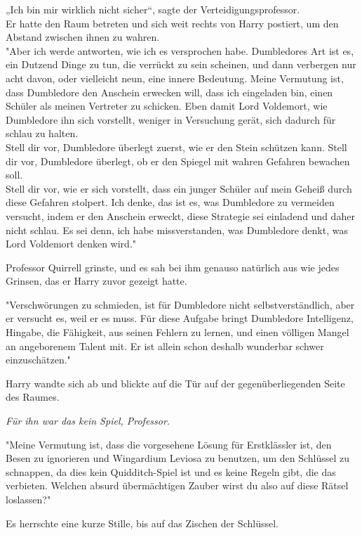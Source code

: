{„Ich bin mir wirklich nicht sicher“, sagte der Verteidigungsprofessor.\\ Er hatte den Raum betreten und sich weit rechts von Harry postiert, um den Abstand zwischen ihnen zu wahren.\\ "Aber ich werde antworten, wie ich es versprochen habe. Dumbledores Art ist es, ein Dutzend Dinge zu tun, die verrückt zu sein scheinen, und dann verbergen nur acht davon, oder vielleicht neun, eine innere Bedeutung. Meine Vermutung ist, dass Dumbledore den Anschein erwecken will, dass ich eingeladen bin, einen Schüler als meinen Vertreter zu schicken. Eben damit Lord Voldemort, wie Dumbledore ihn sich vorstellt, weniger in Versuchung gerät, sich dadurch für schlau zu halten.\\ Stell dir vor, Dumbledore überlegt zuerst, wie er den Stein schützen kann. Stell dir vor, Dumbledore überlegt, ob er den Spiegel mit wahren Gefahren bewachen soll.\\ Stell dir vor, wie er sich vorstellt, dass ein junger Schüler auf mein Geheiß durch diese Gefahren stolpert. Ich denke, das ist es, was Dumbledore zu vermeiden versucht, indem er den Anschein erweckt, diese Strategie sei einladend und daher nicht schlau. Es sei denn, ich habe missverstanden, was Dumbledore denkt, was Lord Voldemort denken wird."

Professor Quirrell grinste, und es sah bei ihm genauso natürlich aus wie jedes Grinsen, das er Harry zuvor gezeigt hatte.

"Verschwörungen zu schmieden, ist für Dumbledore nicht selbstverständlich, aber er versucht es, weil er es muss. Für diese Aufgabe bringt Dumbledore Intelligenz, Hingabe, die Fähigkeit, aus seinen Fehlern zu lernen, und einen völligen Mangel an angeborenem Talent mit. Er ist allein schon deshalb wunderbar schwer einzuschätzen."

Harry wandte sich ab und blickte auf die Tür auf der gegenüberliegenden Seite des Raumes.

\emph{Für ihn war das kein Spiel, Professor.}

"Meine Vermutung ist, dass die vorgesehene Lösung für Erstklässler ist, den Besen zu ignorieren und Wingardium Leviosa zu benutzen, um den Schlüssel zu schnappen, da dies kein Quidditch-Spiel ist und es keine Regeln gibt, die das verbieten. Welchen absurd übermächtigen Zauber wirst du also auf diese Rätsel loslassen?"

Es herrschte eine kurze Stille, bis auf das Zischen der Schlüssel.

}
